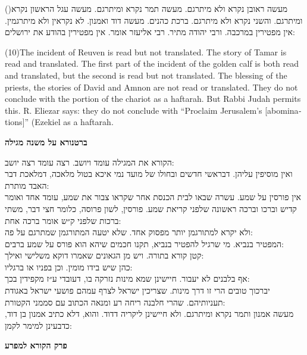 \documentclass[12pt, openany]{book}
\newcommand{\partname}[1]{}
\newcommand{\sethebfont}{
\fontsize{10.5pt}{13.1pt} \selectfont
}
\newcommand{\hebeng}[2]{
	{\sethebfont #1\\}
	
	\begin{english}
		#2
	\end{english}
	\clearpage
}
\newcommand{\chapname}{}
\newcommand{\sectname}{}
\newcommand{\newchap}[1]{
	\addcontentsline{toc}{chapter}{#1}
	\renewcommand{\chapname}{#1}
		\begin{center}
			\textbf{%
\fontsize{16pt}{16pt}\selectfont
				#1}
		\end{center}
}
\newcommand{\newsection}[1]{
	\renewcommand{\sectname}{#1}	
	\vspace{-\baselineskip}
	\begin{center}
		\textbf{%
\fontsize{16pt}{16pt}\selectfont
			#1}
	\end{center}
	\vspace{-\baselineskip}
	\nopagebreak
}
\newcommand{\blockcomment}[2]{ 
\newsection{#1}
\sethebfont	#2}
\newcommand{\vsnum}[1]{(\hebrewnumeral{#1})\space}
\newcommand{\vsnumeng}[1]{(#1)\space}
\begin{document}
\hebeng{\vsnum{10}מעשה ראובן נקרא ולא מיתרגם. מעשה תמר נקרא ומיתרגם. מעשה עגל הראשון נקרא ומיתרגם. והשני נקרא ולא מיתרגם. ברכת כהנים. מעשה דוד ואמנון. לא נקראין ולא מיתרגמין. אין מפטירין במרכבה. ורבי יהודה מתיר. רבי אליעזר אומר. אין מפטירין בהודע את ירושלים:  }{\vsnumeng{10}The incident of Reuven is read but not translated. The story of Tamar is read and translated. The first part of the incident of the golden calf is both read and translated, but the second is read but not translated. The blessing of the priests, the stories of David and Amnon are not read or translated. They do not conclude with the portion of the chariot as a haftarah. But Rabbi Judah permits this. R. Eliezar says: they do not conclude with “Proclaim Jerusalem’s {[abominations]}” (Ezekiel as a haftarah.}%

\blockcomment{ברטנורא על משנה מגילה}{הקורא את המגילה עומד ויושב. רצה עומד רצה יושב:\\ואין מוסיפין עליהן. דבראשי חדשים ובחולו של מועד נמי איכא בטול מלאכה, דמלאכת דבר האבד מותרת:\\אין פורסין על שמע. עשרה שבאו לבית הכנסת אחר שקראו צבור את שמע, עומד אחד ואומר קדיש וברכו וברכה ראשונה שלפני קריאת שמע. פורסין, לשון פרוסה, כלומר חצי דבר, משתי ברכות שלפני ק״ש אומר ברכה אחת:\\ולא יקרא למתורגמן יותר מפסוק אחד. שלא יטעה המתורגמן שמתרגם על פה:\\המפטיר בנביא. מי שרגיל להפטיר בנביא, תקנו חכמים שיהא הוא פורס על שמע ברבים:\\קטן קורא בתורה. ויש מן הגאונים שאמרו דוקא משלישי ואילך:\\כהן שיש בידו מומין. וכן בפניו או ברגליו:\\אף בלבנים לא יעבור. חיישינן שמא מינות נזרקה בו, דעובדי ע״ז מקפידין בכך:\\יברכוך טובים הרי זו דרך מינות. שצריכין ישראל לצרף עמהם פושעי ישראל באגודת תעניותיהם. שהרי חלבנה ריחה רע ומנאה הכתוב עם סממני הקטורת:\\מעשה אמנון ותמר נקרא ומיתרגם. ולא חיישינן ליקריה דדוד. והוא, דלא כתיב אמנון בן דוד, כדבעינן למימר לקמן:\\\n}\clearpage %
\renewcommand{\partname}[1]{בן יהוידע על מגילה}
\newchap{פרק  הקורא למפרע}
\end{document}
